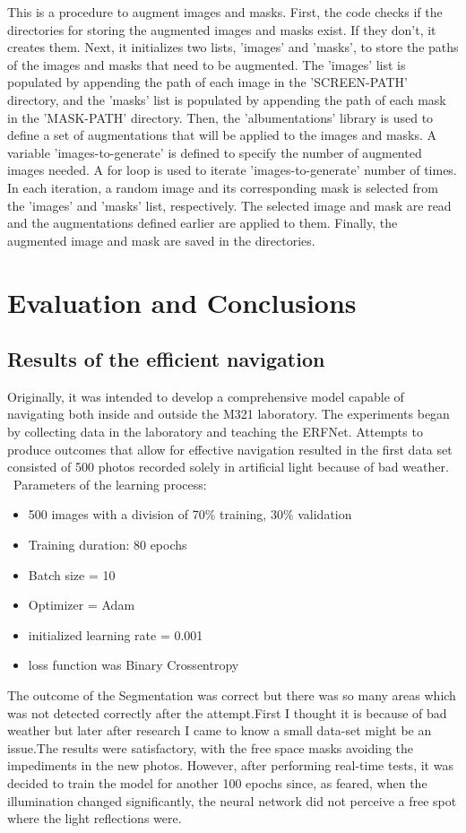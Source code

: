 \documentclass[11pt, a4paper, openany]{book}
\begin{document}
This is a procedure to augment images and masks. First, the code checks if the directories for storing the augmented images and masks exist. If they don't, it creates them. Next, it initializes two lists, 'images' and 'masks', to store the paths of the images and masks that need to be augmented. The 'images' list is populated by appending the path of each image in the 'SCREEN-PATH' directory, and the 'masks' list is populated by appending the path of each mask in the 'MASK-PATH' directory. Then, the 'albumentations' library is used to define a set of augmentations that will be applied to the images and masks. A variable 'images-to-generate' is defined to specify the number of augmented images needed. A for loop is used to iterate 'images-to-generate' number of times. In each iteration, a random image and its corresponding mask is selected from the 'images' and 'masks' list, respectively. The selected image and mask are read and the augmentations defined earlier are applied to them. Finally, the augmented image and mask are saved in the directories.








\chapter{Evaluation and Conclusions}
\section{Results of the efficient navigation}
Originally, it was intended to develop a comprehensive model capable of navigating both inside and outside the M321 laboratory. The experiments began by collecting data in the laboratory and teaching the ERFNet.
Attempts to produce outcomes that allow for effective navigation resulted in the first data set consisted of 500 photos recorded solely in artificial light because of bad weather.
 Parameters of the learning process:
 \begin{itemize}
     \item 500 images with a division of 70\% training, 30\% validation
     \item  Training duration: 80 epochs
     \item Batch size = 10
     \item Optimizer = Adam
     \item initialized learning rate = 0.001
     \item loss function was Binary Crossentropy
 \end{itemize}
 The outcome of the Segmentation was correct but there was so many areas which was not detected correctly after the attempt.First I thought it is because of bad weather but later after research I came to know a small data-set might be an issue.The results were satisfactory, with the free space masks avoiding the impediments in the new photos. However, after performing real-time tests, it was decided to train the model for another 100 epochs since, as feared, when the illumination changed significantly, the neural network did not perceive a free spot where the light reflections were.
 
\end{document}
